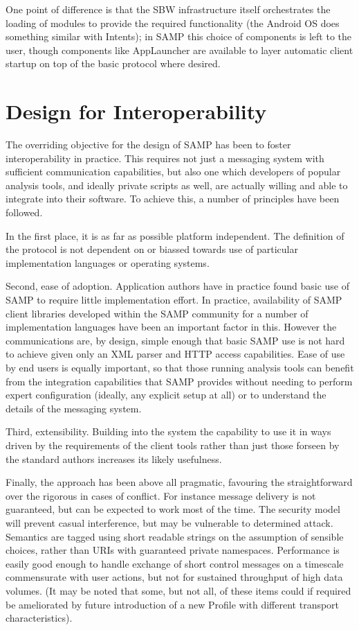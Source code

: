 \documentclass[5p]{elsarticle}
\begin{document}
One point of difference is that
the SBW infrastructure itself orchestrates the loading of
modules to provide the required functionality
(the Android OS does something similar with Intents);
in SAMP this choice of components is left to the user,
though components like AppLauncher
\citep{2012ASPC..461..379L} are available to
layer automatic client startup on top of the basic protocol where desired.



\section{Design for Interoperability} \label{sec:design}

The overriding objective for the design of SAMP
has been to foster interoperability in practice.
This requires not just a messaging system with sufficient communication
capabilities, but also one which developers of popular analysis tools,
and ideally private scripts as well,
are actually willing and able to integrate into their software.
To achieve this, a number of principles
have been followed.

In the first place, it is as far as possible platform independent.
The definition of the protocol is not dependent on or biassed
towards use of particular implementation languages or operating systems.

Second, ease of adoption.
Application authors have in practice found basic use of 
SAMP to require little implementation effort.
In practice, availability of SAMP client libraries
developed within the SAMP community
for a number of implementation languages have been an important
factor in this.
However the communications are, by design, simple enough that
basic SAMP use is not hard to achieve given only an XML parser
and HTTP access capabilities.
Ease of use by end users is equally important,
so that those running analysis tools
can benefit from the integration capabilities that SAMP provides
without needing to perform expert configuration
(ideally, any explicit setup at all) or to understand the details
of the messaging system.

Third, extensibility.
Building into the system the capability to use it in ways
driven by the requirements of the client tools rather than
just those forseen by the standard authors increases its likely usefulness.

Finally, the approach has been above all pragmatic, favouring
the straightforward over the rigorous in cases of conflict.
For instance message delivery is not guaranteed, but can be 
expected to work most of the time.
The security model will prevent casual interference,
but may be vulnerable to determined attack.
Semantics are tagged
using short readable strings on the assumption of sensible choices,
rather than URIs with guaranteed private namespaces.
Performance is easily good enough to handle exchange of short control
messages on a timescale commensurate with user actions,
but not for sustained throughput of high data volumes.
(It may be noted that some, but not all,
of these items could if required be ameliorated by future
introduction of a new Profile with different transport characteristics).
\end{document}
